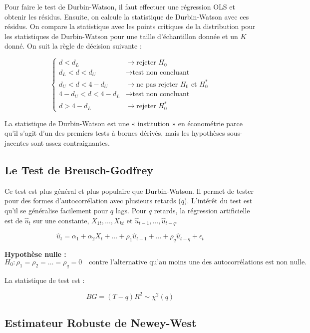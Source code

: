 \documentclass[14pt]{extarticle} %
\theoremstyle{definition}
\theoremstyle{plain}
\begin{document}
Pour faire le test de Durbin-Watson, il faut effectuer une régression OLS et obtenir les résidus. Ensuite, on calcule la statistique de Durbin-Watson avec ces résidus. On compare la statistique avec les points critiques de la distribution pour les statistiques de Durbin-Watson pour une taille d’échantillon donnée et un $K$ donné. On suit la règle de décision suivante :

\[
\begin{cases}
d < d_L & \rightarrow \text{rejeter } H_0 \\
d_L < d < d_U & \rightarrow \text{test non concluant} \\
d_U < d < 4 - d_U & \rightarrow \text{ne pas rejeter } H_0 \text{ et } H_0^* \\
4 - d_U < d < 4 - d_L & \rightarrow \text{test non concluant} \\
d > 4 - d_L & \rightarrow \text{rejeter } H_0^*
\end{cases}
\]

La statistique de Durbin-Watson est une « institution » en économétrie parce qu’il s’agit d’un des premiers tests à bornes dérivés, mais les hypothèses sous-jacentes sont assez contraignantes.

\subsection{Le Test de Breusch-Godfrey}

Ce test est plus général et plus populaire que Durbin-Watson. Il permet de tester pour des formes d’autocorrélation avec plusieurs retards ($q$). L’intérêt du test est qu’il se généralise facilement pour $q$ lags. Pour $q$ retards, la régression artificielle est de $\hat{u}_t$ sur une constante, $X_{1t}, \dots, X_{kt}$ et $\hat{u}_{t-1}, \dots, \hat{u}_{t-q}$.

\[
\hat{u}_t = \alpha_1 + \alpha_2 X_t + \dots + \rho_1 \hat{u}_{t-1} + \dots + \rho_q \hat{u}_{t-q} + \epsilon_t
\]

\textbf{Hypothèse nulle :}
\[
H_0 : \rho_1 = \rho_2 = \dots = \rho_q = 0 \quad \text{contre l’alternative qu’au moins une des autocorrélations est non nulle.}
\]

La statistique de test est :

\[
BG = (T - q) R^2 \sim \chi^2(q)
\]

\subsection{Estimateur Robuste de Newey-West}
\end{document}
